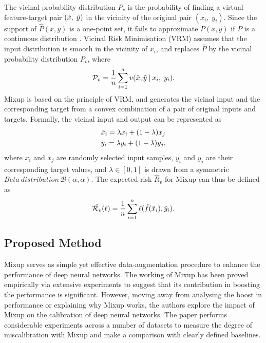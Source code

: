 \documentclass{article}
\begin{document}
The vicinal probability distribution ${P}_v$ is the probability of finding a virtual feature-target pair
$ (\Tilde{x},\; \Tilde{y})$ in the vicinity of the original pair $(x_i,\; y_i)$. Since the support of $\hat{P}(x,y)$ is a one-point set, it fails to approximate $P(x,y)$ if $P$ is a continuous distribution \cite{vrm_0, vrm_1}. Vicinal Risk Minimisation (VRM) \cite{vrm_0} assumes that the input distribution is smooth in the vicinity of $x_i$, and replaces $\hat{P}$ by the vicinal probability distribution ${P}_v$, where
\begin{equation}
    \mathcal{P}_v = \frac{1}{n} \sum_{i=1}^{n} v(\Tilde{x}, \Tilde{y}\: |\: x_i,\; y_i).
\end{equation}
Mixup \cite{mixup_2018} is based on the principle of VRM, and generates the vicinal input and the corresponding target from a convex combination of a pair of original inputs and targets. Formally, the vicinal input and output can be represented as
\begin{align}
    &\Tilde{x}_i = \lambda x_i + (1-\lambda)x_j \\
    &\Tilde{y}_i = \lambda y_i + (1-\lambda)y_j,
\end{align}
where $x_i$ and $x_j$ are randomly selected input samples, $y_i$ and $y_j$ are their corresponding target values, and $\lambda \in [0, 1] $ is drawn from a symmetric $Beta\: distribution \:\mathcal{B}(\alpha, \alpha)$. The expected risk $\hat{R}_v$ for Mixup can thus be defined as
\begin{equation}
\hat{\mathcal{R}_v}(\ell) = \frac{1}{n}\sum_{i=1}^{n} \ell(\hat{f}(\Tilde{x}_i), \Tilde{y}_i).
\label{eq:vrm}
\end{equation}

\subsection{Proposed Method}
Mixup serves as simple yet effective data-augmentation procedure to enhance the performance of deep neural networks. The working of Mixup has been proved empirically via extensive experiments to suggest that its contribution in boosting the performance is significant. However, moving away from analysing the boost in performance or explaining why Mixup works, the authors explore the impact of Mixup on the calibration of deep neural networks. The paper performs considerable experiments across a number of datasets to measure the degree of miscalibration with Mixup and make a comparison with clearly defined baselines.
\end{document}
